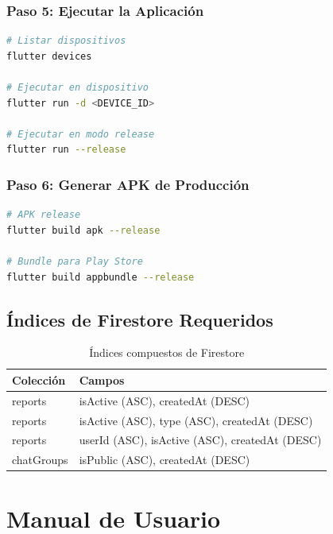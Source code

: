 \documentclass[12pt,a4paper]{article}
\begin{document}
\subsubsection{Paso 5: Ejecutar la Aplicación}
\begin{lstlisting}[language=bash]
# Listar dispositivos
flutter devices

# Ejecutar en dispositivo
flutter run -d <DEVICE_ID>

# Ejecutar en modo release
flutter run --release
\end{lstlisting}

\subsubsection{Paso 6: Generar APK de Producción}
\begin{lstlisting}[language=bash]
# APK release
flutter build apk --release

# Bundle para Play Store
flutter build appbundle --release
\end{lstlisting}

\subsection{Índices de Firestore Requeridos}

\begin{table}[h]
\centering
\begin{tabular}{|l|l|}
\hline
\textbf{Colección} & \textbf{Campos} \\
\hline
reports & isActive (ASC), createdAt (DESC) \\
reports & isActive (ASC), type (ASC), createdAt (DESC) \\
reports & userId (ASC), isActive (ASC), createdAt (DESC) \\
chatGroups & isPublic (ASC), createdAt (DESC) \\
\hline
\end{tabular}
\caption{Índices compuestos de Firestore}
\end{table}


\section{Manual de Usuario}
\end{document}

